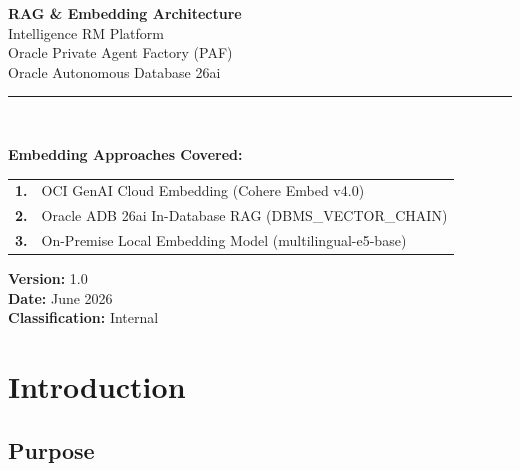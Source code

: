 \documentclass[12pt,a4paper]{article}
\begin{document}
\begin{titlepage}
  \centering
  \vspace*{3cm}

  {\Huge\bfseries\color{sectionColor}
    RAG \& Embedding Architecture\\[0.3em]
  }
  {\LARGE\color{oracleDark}
    Intelligence RM Platform\\[0.5em]
  }
  {\Large\color{gray}
    Oracle Private Agent Factory (PAF)\\
    Oracle Autonomous Database 26ai\\[2em]
  }

  \rule{0.6\textwidth}{0.5pt}\\[2em]

  {\large
    \textbf{Embedding Approaches Covered:}\\[0.8em]
    \begin{tabular}{rl}
      \textcolor{oracleBlue}{\textbf{1.}} & OCI GenAI Cloud Embedding (Cohere Embed v4.0)\\[0.3em]
      \textcolor{oracleBlue}{\textbf{2.}} & Oracle ADB 26ai In-Database RAG (DBMS\_VECTOR\_CHAIN)\\[0.3em]
      \textcolor{oracleBlue}{\textbf{3.}} & On-Premise Local Embedding Model (multilingual-e5-base)\\[0.3em]
    \end{tabular}
  }

  \vfill

  {\normalsize
    \textbf{Version:} 1.0\\
    \textbf{Date:} June 2026\\
    \textbf{Classification:} Internal\\
  }
\end{titlepage}

\tableofcontents
\newpage

\section{Introduction}

\subsection{Purpose}
\end{document}
